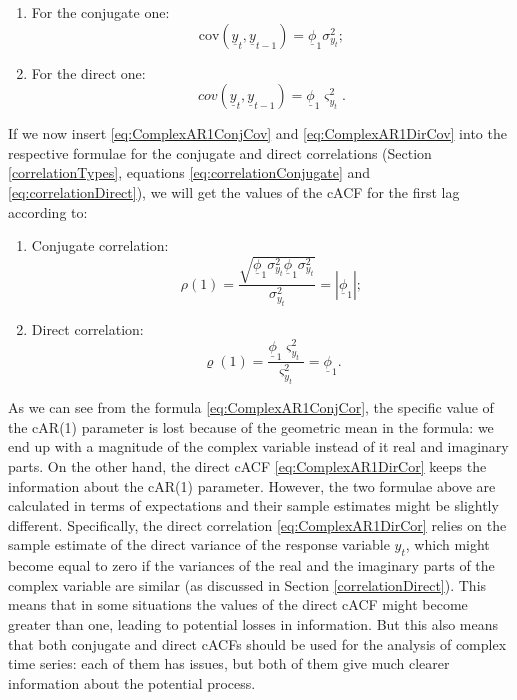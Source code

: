 \documentclass[
]{book}
\providecommand{\tightlist}{%
  \setlength{\itemsep}{0pt}\setlength{\parskip}{0pt}}
\begin{document}
\begin{enumerate}
\def\labelenumi{\arabic{enumi}.}
\tightlist
\item
  For the conjugate one:
  \begin{equation}
   \mathrm{cov}\left(\underline{y}_t, \underline{y}_{t-1} \right) = \underline{\phi}_1 \sigma^2_{y_t} ;
   \label{eq:ComplexAR1ConjCov}
  \end{equation}
\item
  For the direct one:
  \begin{equation}
   cov \left(\underline{y}_t, \underline{y}_{t-1} \right) = \underline{\phi}_1 \varsigma^2_{y_t} .
   \label{eq:ComplexAR1DirCov}
  \end{equation}
\end{enumerate}

If we now insert \eqref{eq:ComplexAR1ConjCov} and \eqref{eq:ComplexAR1DirCov} into the respective formulae for the conjugate and direct correlations (Section \ref{correlationTypes}, equations \eqref{eq:correlationConjugate} and \eqref{eq:correlationDirect}), we will get the values of the cACF for the first lag according to:

\begin{enumerate}
\def\labelenumi{\arabic{enumi}.}
\item
  Conjugate correlation:
  \begin{equation}
   \rho(1) = \frac{\sqrt{\underline{\phi}_1 \sigma^2_{y_t} \underline{\phi}_1 \sigma^2_{y_t}}}{\sigma_{y_t}^2} = | \underline{\phi}_1 |;
   \label{eq:ComplexAR1ConjCor}
  \end{equation}
\item
  Direct correlation:
  \begin{equation}
   \varrho(1) = \frac{\underline{\phi}_1 \varsigma^2_{y_t}}{\varsigma^2_{y_t}} = \underline{\phi}_1.
   \label{eq:ComplexAR1DirCor}
  \end{equation}
\end{enumerate}

As we can see from the formula \eqref{eq:ComplexAR1ConjCor}, the specific value of the cAR(1) parameter is lost because of the geometric mean in the formula: we end up with a magnitude of the complex variable instead of it real and imaginary parts. On the other hand, the direct cACF \eqref{eq:ComplexAR1DirCor} keeps the information about the cAR(1) parameter. However, the two formulae above are calculated in terms of expectations and their sample estimates might be slightly different. Specifically, the direct correlation \eqref{eq:ComplexAR1DirCor} relies on the sample estimate of the direct variance of the response variable \(y_t\), which might become equal to zero if the variances of the real and the imaginary parts of the complex variable are similar (as discussed in Section \ref{correlationDirect}). This means that in some situations the values of the direct cACF might become greater than one, leading to potential losses in information. But this also means that both conjugate and direct cACFs should be used for the analysis of complex time series: each of them has issues, but both of them give much clearer information about the potential process.
\end{document}
